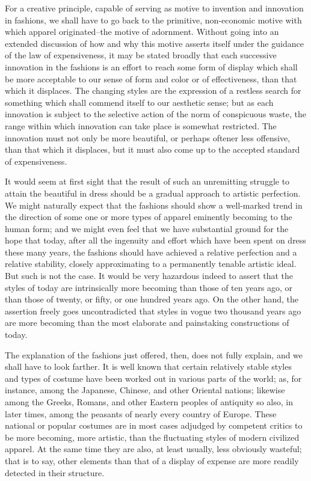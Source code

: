 \documentclass[12pt]{report}
\begin{document}
For a creative principle, capable of serving as motive to invention
and innovation in fashions, we shall have to go back to the primitive,
non-economic motive with which apparel originated--the motive of
adornment. Without going into an extended discussion of how and why this
motive asserts itself under the guidance of the law of expensiveness, it
may be stated broadly that each successive innovation in the fashions is
an effort to reach some form of display which shall be more acceptable
to our sense of form and color or of effectiveness, than that which it
displaces. The changing styles are the expression of a restless search
for something which shall commend itself to our aesthetic sense; but
as each innovation is subject to the selective action of the norm of
conspicuous waste, the range within which innovation can take place is
somewhat restricted. The innovation must not only be more beautiful,
or perhaps oftener less offensive, than that which it displaces, but it
must also come up to the accepted standard of expensiveness.

It would seem at first sight that the result of such an unremitting
struggle to attain the beautiful in dress should be a gradual approach
to artistic perfection. We might naturally expect that the fashions
should show a well-marked trend in the direction of some one or more
types of apparel eminently becoming to the human form; and we might even
feel that we have substantial ground for the hope that today, after
all the ingenuity and effort which have been spent on dress these many
years, the fashions should have achieved a relative perfection and
a relative stability, closely approximating to a permanently tenable
artistic ideal. But such is not the case. It would be very hazardous
indeed to assert that the styles of today are intrinsically more
becoming than those of ten years ago, or than those of twenty, or fifty,
or one hundred years ago. On the other hand, the assertion freely goes
uncontradicted that styles in vogue two thousand years ago are more
becoming than the most elaborate and painstaking constructions of today.

The explanation of the fashions just offered, then, does not fully
explain, and we shall have to look farther. It is well known that
certain relatively stable styles and types of costume have been worked
out in various parts of the world; as, for instance, among the Japanese,
Chinese, and other Oriental nations; likewise among the Greeks, Romans,
and other Eastern peoples of antiquity so also, in later times, among
the peasants of nearly every country of Europe. These national or
popular costumes are in most cases adjudged by competent critics to
be more becoming, more artistic, than the fluctuating styles of modern
civilized apparel. At the same time they are also, at least usually,
less obviously wasteful; that is to say, other elements than that of a
display of expense are more readily detected in their structure.
\end{document}
